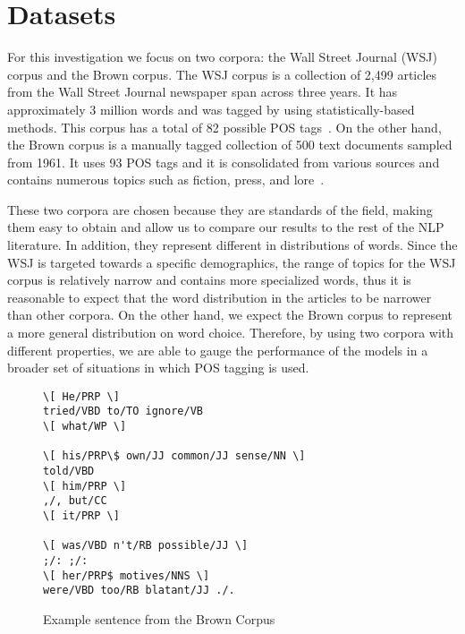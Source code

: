 \section{Datasets}
\label{sec:datasets}
For this investigation we focus on two corpora: the Wall Street Journal (WSJ) corpus and the Brown corpus. The WSJ corpus is a collection of 2,499 articles from the Wall Street Journal newspaper span across three years. It has approximately 3 million words and was tagged by using statistically-based methods. This corpus has a total of 82 possible POS tags~\cite{wsjCorpus}. On the other hand, the Brown corpus is a manually tagged collection of 500 text documents sampled from 1961. It uses 93 POS tags and it is consolidated from various sources and contains numerous topics such as fiction, press, and lore~\cite{brownCorpus}.

These two corpora are chosen because they are standards of the field, making them easy to obtain and allow us to compare our results to the rest of the NLP literature. In addition, they represent different in distributions of words. Since the WSJ is targeted towards a specific demographics, the range of topics for the WSJ corpus is relatively narrow and contains more specialized words, thus it is reasonable to expect that the word distribution in the articles to be narrower than other corpora. On the other hand, we expect the Brown corpus to represent a more general distribution on word choice. Therefore, by using two corpora with different properties, we are able to gauge the performance of the models in a broader set of situations in which POS tagging is used.

\begin{figure}[ht]
 \begin{Verbatim}[frame=single,framesep=5mm]
\[ He/PRP \]
tried/VBD to/TO ignore/VB
\[ what/WP \]

\[ his/PRP\$ own/JJ common/JJ sense/NN \]
told/VBD
\[ him/PRP \]
,/, but/CC
\[ it/PRP \]

\[ was/VBD n't/RB possible/JJ \]
;/: ;/:
\[ her/PRP$ motives/NNS \]
were/VBD too/RB blatant/JJ ./.
\end{Verbatim}
\caption{Example sentence from the Brown Corpus~\cite{brownCorpus} \label{brownExample}}
\end{figure}
